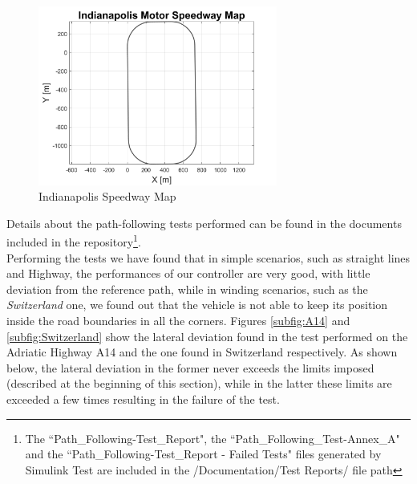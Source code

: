 \begin{enumerate}
    \begin{figure}[H]
    \centering
    \includegraphics[width=0.7\textwidth]{Figures/IndianapolisMap.png}
    \caption{Indianapolis Speedway Map}
      \label{fig:Indianapolis}
\end{figure}
\end{enumerate}

\pagebreak
Details about the path-following tests performed can be found in the documents included in the repository\footnote{The ``Path\_Following-Test\_Report", the ``Path\_Following\_Test-Annex\_A" and the ``Path\_Following-Test\_Report - Failed Tests" files generated by Simulink Test are included in the /Documentation/Test Reports/ file path}.\\
Performing the tests we have found that in simple scenarios, such as straight lines and Highway, the performances of our controller are very good, with little deviation from the reference path, while in winding scenarios, such as the \textit{Switzerland} one, we found out that the vehicle is not able to keep its position inside the road boundaries in all the corners.
Figures \ref{subfig:A14} and \ref{subfig:Switzerland} show the lateral deviation found in the test performed on the Adriatic Highway A14 and the one found in Switzerland respectively. As shown below, the lateral deviation in the former never exceeds the limits imposed (described at the beginning of this section), while in the latter these limits are exceeded a few times resulting in the failure of the test.


